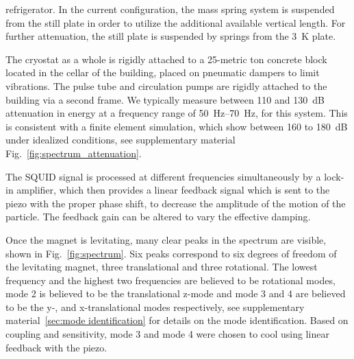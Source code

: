 \noindent
refrigerator. In the current configuration, the mass spring system is suspended from the still plate in order to utilize the additional available vertical length. For further attenuation, the still plate is suspended by springs from the \SI{3}{K} plate. 

The cryostat as a whole is rigidly attached to a 25-metric ton concrete block located in the cellar of the building, placed on pneumatic dampers to limit vibrations. The pulse tube and circulation pumps are rigidly attached to the building via a second frame. We typically measure between \SI{110}{} and \SI{130}{dB} attenuation in energy at a frequency range of \SIrange{50}{70}{Hz}, for this system. This is consistent with a finite element simulation, which show between \SI{160}{} to \SI{180}{dB} under idealized conditions, see supplementary material Fig.~\ref{fig:spectrum_attenuation}. 



The SQUID signal is processed at different frequencies simultaneously by a lock-in amplifier, which then provides a linear feedback signal which is sent to the piezo with the proper phase shift, to decrease the amplitude of the motion of the particle. The feedback gain can be altered to vary the effective damping.

Once the magnet is levitating, many clear peaks in the spectrum are visible, shown in Fig.~\ref{fig:spectrum}. Six peaks correspond to six degrees of freedom of the levitating magnet, three translational and three rotational. The lowest frequency and the highest two frequencies are believed to be rotational modes, mode 2 is believed to be the translational z-mode and mode 3 and 4 are believed to be the y-, and x-translational modes respectively, see supplementary material~\ref{sec:mode identification} for details on the mode identification. Based on coupling and sensitivity, mode 3 and mode 4 were chosen to cool using linear feedback with the piezo.

